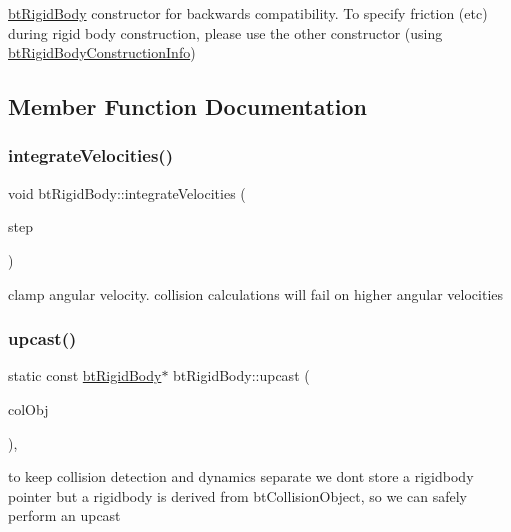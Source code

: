 \hyperlink{classbtRigidBody}{bt\+Rigid\+Body} constructor for backwards compatibility. To specify friction (etc) during rigid body construction, please use the other constructor (using \hyperlink{structbtRigidBody_1_1btRigidBodyConstructionInfo}{bt\+Rigid\+Body\+Construction\+Info}) 

\subsection{Member Function Documentation}
\mbox{\label{classbtRigidBody_a16029bc5aabcbb33aaf7e6e6e819283a}} 
\subsubsection{\texorpdfstring{integrate\+Velocities()}{integrateVelocities()}}
{\footnotesize\ttfamily void bt\+Rigid\+Body\+::integrate\+Velocities (\begin{DoxyParamCaption}\item[{bt\+Scalar}]{step }\end{DoxyParamCaption})}

clamp angular velocity. collision calculations will fail on higher angular velocities \mbox{\label{classbtRigidBody_a59077fce3d2efd193a3fd7d7de2c97e8}} 
\subsubsection{\texorpdfstring{upcast()}{upcast()}\hspace{0.1cm}{\footnotesize\ttfamily [1/2]}}
{\footnotesize\ttfamily static const \hyperlink{classbtRigidBody}{bt\+Rigid\+Body}$\ast$ bt\+Rigid\+Body\+::upcast (\begin{DoxyParamCaption}\item[{const bt\+Collision\+Object $\ast$}]{col\+Obj }\end{DoxyParamCaption})\hspace{0.3cm}{\ttfamily [inline]}, {\ttfamily [static]}}

to keep collision detection and dynamics separate we don\textquotesingle{}t store a rigidbody pointer but a rigidbody is derived from bt\+Collision\+Object, so we can safely perform an upcast \mbox{\label{classbtRigidBody_a59077fce3d2efd193a3fd7d7de2c97e8}} 
